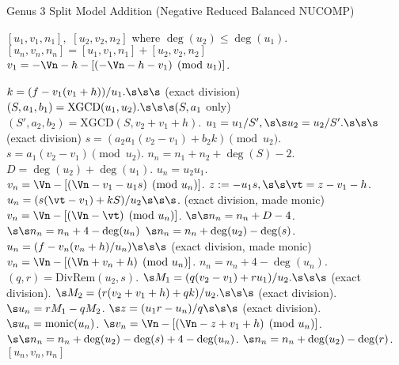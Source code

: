     
\begin{algorithm}[htbp]
\caption{Genus 3 Split Model Addition (Negative Reduced Balanced NUCOMP)}
\label{alg:g3balnucomp}
\begin{algorithmic}[1]
\Require $[u_1,v_1,n_1],$ $[u_2,v_2,n_2]$ where $\deg(u_2) \leq \deg(u_1)$.
\Ensure $[u_n,v_n,n_n] = [u_1,v_1,n_1] + [u_2,v_2,n_2]$
    \State $v_1 = -\Vn - h - [(-\Vn - h - v_1) \pmod{u_1}]$.
\EndIf

\State $k = (f - v_1(v_1 + h))/u_1. \s\s\s$ (exact division)
\State $(S,a_1,b_1) = \mathrm{XGCD}(u_1,u_2). \s\s\s  (S, a_1$ only)
\State $(S',a_2,b_2) = \mathrm{XGCD}(S,v_2 + v_1 + h)$.
        \State $u_1 = u_1/S', \s\s u_2 = u_2/S'. \s\s\s$ (exact division)
    \EndIf
    \State $s = (a_2a_1(v_2 - v_1) + b_2k) \pmod{u_2}$.
\Else
    \State $s = a_1(v_2 - v_1) \pmod{u_2}$.
\EndIf
\State $n_n = n_1 + n_2 + \deg(S) - 2$.
\State $D = \deg(u_2) + \deg(u_1)$.
    \State $u_n = u_2u_1$.
    \State $v_n = \Vn - [(\Vn - v_1 - u_1s) \pmod{u_n}]$.
    \State $z := -u_1s, \s\s \vt = z - v_1 - h$.
    \State $u_n = (s(\vt - v_1) + kS)/u_2 \s\s\s$. (exact division, made monic)
    \State $v_n = \Vn - [(\Vn - \vt) \pmod{u_n}]$.
     $\s\s n_n = n_n + D - 4$.
    \Else
         $\s\s n_n = n_n + 4 - \deg(u_n)$ 
        \Else \hspace{75pt} $\s n_n = n_n + \deg(u_2) - \deg(s)$.
        \EndIf
            \State $u_n = (f - v_n(v_n + h)/u_n) \s\s\s$ (exact division, made monic)
            \State $v_n = \Vn - [(\Vn + v_n + h) \pmod{u_n}]$.
            \State $n_n = n_n + 4 - \deg(u_n)$.
        \EndIf
    \EndIf
\Else\hspace{2pt} 
    \State $(q,r) = \mathrm{DivRem}(u_2,s)$.
    \State $\s M_1 = (q(v_2 - v_1) + ru_1)/u_2. \s\s\s$ (exact division).
    \State $\s M_2 = (r(v_2 + v_1 + h) + qk)/u_2. \s\s\s$ (exact division).
    \State $\s u_n = rM_1 - qM_2$.
    \State $\s z = (u_1r - u_n)/q \s\s\s$ (exact division).
    \State $\s u_n = \mathrm{monic}(u_n)$.
    \State $\s v_n = \Vn - [(\Vn - z + v_1 + h) \pmod{u_n}]$.
     $\s\s n_n = n_n + \deg(u_2) - \deg(s) + 4 - \deg(u_n)$.
    \Else \hspace{74pt} $\s n_n = n_n + \deg(u_2) - \deg(r)$.
    \EndIf
\EndIf
\State \Return $[u_n,v_n,n_n]$
\end{algorithmic}
\end{algorithm}

